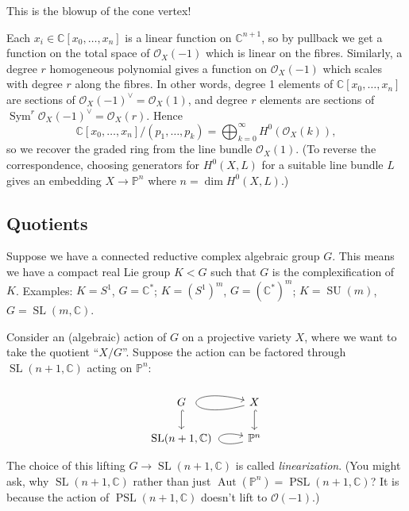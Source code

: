 \documentclass{article}
\theoremstyle{definition}
\DeclareMathOperator{\Aut}{Aut}
\DeclareMathOperator{\SU}{SU}
\DeclareMathOperator{\SL}{SL}
\DeclareMathOperator{\PSL}{PSL}
\DeclareMathOperator{\Sym}{Sym}
\renewcommand{\O}{\mathcal{O}}
\renewcommand{\P}{\mathbb{P}}
\newcommand{\C}{\mathbb{C}}
\begin{document}
This is the blowup of the cone vertex!

Each $x_i\in\C[x_0,\ldots,x_n]$ is a linear function on $\C^{n+1}$, so by
pullback we get a function on the total space of $\O_X(-1)$ which is linear on
the fibres. Similarly, a degree $r$ homogeneous polynomial gives a function on
$\O_X(-1)$ which scales with degree $r$ along the fibres. In other words, degree
1 elements of $\C[x_0,\ldots,x_n]$ are sections of $\O_X(-1)^\vee=\O_X(1)$, and
degree $r$ elements are sections of $\Sym^r\O_X(-1)^\vee=\O_X(r)$. Hence
\begin{equation*}
    \C[x_0,\ldots,x_n]/(p_1,\ldots,p_k) = \bigoplus_{k=0}^\infty H^0(\O_X(k)),
\end{equation*}
so we recover the graded ring from the line bundle $\O_X(1)$. (To reverse the
correspondence, choosing generators for $H^0(X,L)$ for a suitable line bundle
$L$ gives an embedding $X\to\P^n$ where $n=\dim H^0(X,L)$.)

\subsection*{Quotients}

Suppose we have a connected reductive complex algebraic group $G$. This means we
have a compact real Lie group $K<G$ such that $G$ is the complexification of
$K$. Examples: $K=S^1$, $G=\C^*$; $K=(S^1)^m$, $G=(\C^*)^m$; $K=\SU(m)$,
$G=\SL(m,\C)$.

Consider an (algebraic) action of $G$ on a projective variety $X$, where we want
to take the quotient ``$X/G$''. Suppose the action can be factored through
$\SL(n+1,\C)$ acting on $\P^n$:
\begin{equation*}
    \begin{tikzcd}
        G \ar[d,hook] & X \ar[loop left, distance=60] \ar[d,hook] \\
        \SL(n+1,\C) & \P^n \ar[loop left, distance=30]
    \end{tikzcd}
\end{equation*}
The choice of this lifting $G\to\SL(n+1,\C)$ is called \emph{linearization}.
(You might ask, why $\SL(n+1,\C)$ rather than just $\Aut(\P^n)=\PSL(n+1,\C)$? It
is because the action of $\PSL(n+1,\C)$ doesn't lift to $\O(-1)$.)
\end{document}
